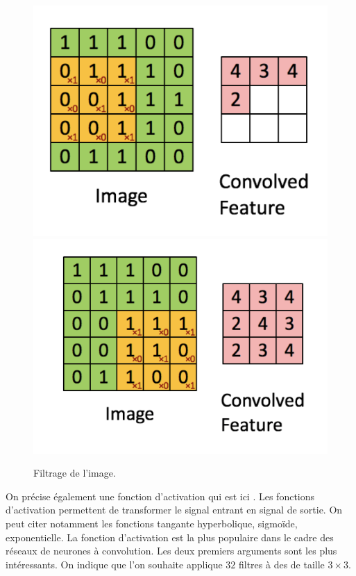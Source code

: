 \begin{figure}[h]
  \centering
  \includegraphics[scale=0.6]{assets/filtrage}
  \includegraphics[scale=0.6]{assets/image-filtree}
  \caption{Filtrage de l'image.}
  \label{fig:filtrage}
\end{figure}


On précise également une fonction d'activation qui est ici .
Les fonctions d'activation permettent de transformer le signal 
entrant en signal de sortie. On peut citer notamment les 
fonctions tangante hyperbolique, sigmoïde, exponentielle. La fonction d'activation 
 est la plus populaire dans le cadre des réseaux de neurones à convolution.
Les deux premiers arguments sont les plus intéressants. 
On indique que l'on souhaite applique $32$ filtres à des  de taille 
$3 \times 3$. 

